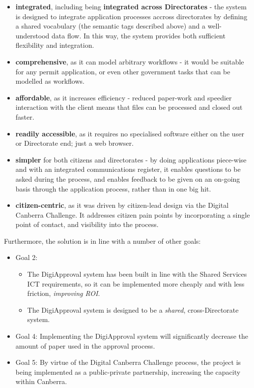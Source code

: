 \documentclass[12pt,a4paper,twosided]{article}
\begin{document}
\begin{itemize}

\item
  \textbf{integrated}, including being \textbf{integrated across
  Directorates} - the system is designed to integrate application
  processes accross directorates by defining a shared vocabulary (the
  semantic tags described above) and a well-understood data flow. In
  this way, the system provides both sufficient flexibility and
  integration.
\item
  \textbf{comprehensive}, as it can model arbitrary workflows - it would
  be suitable for any permit application, or even other government tasks
  that can be modelled as workflows.
\item
  \textbf{affordable}, as it increases efficiency - reduced paper-work
  and speedier interaction with the client means that files can be
  processed and closed out faster.
\item
  \textbf{readily accessible}, as it requires no specialised software
  either on the user or Directorate end; just a web browser.
\item
  \textbf{simpler} for both citizens and directorates - by doing
  applications piece-wise and with an integrated communications
  register, it enables questions to be asked during the process, and
  enables feedback to be given on an on-going basis through the
  application process, rather than in one big hit.
\item
  \textbf{citizen-centric}, as it was driven by citizen-lead design via
  the Digital Canberra Challenge. It addresses citizen pain points by
  incorporating a single point of contact, and visibility into the
  process.
\end{itemize}

Furthermore, the solution is in line with a number of other goals:

\begin{itemize}

\item
  Goal 2:

  \begin{itemize}
  
  \item
    The DigiApproval system has been built in line with the Shared
    Services ICT requirements, so it can be implemented more cheaply and
    with less friction, \emph{improving ROI}.
  \item
    The DigiApproval system is designed to be a \emph{shared},
    cross-Directorate system.
  \end{itemize}
\item
  Goal 4: Implementing the DigiApproval system will significantly
  decrease the amount of paper used in the approval process.
\item
  Goal 5: By virtue of the Digital Canberra Challenge process, the
  project is being implemented as a public-private partnership,
  increasing the capacity within Canberra.
\end{itemize}
\end{document}
